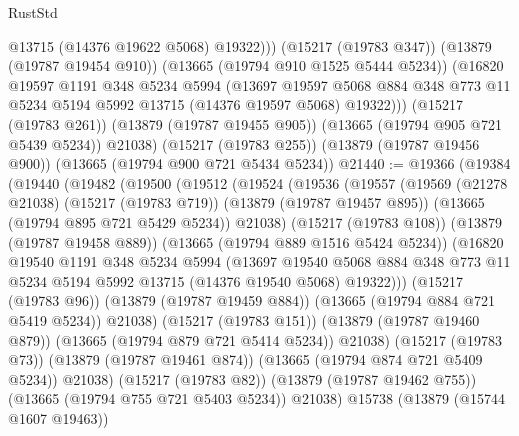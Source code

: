 \begin{lexlean}{RustStd}
\begin{coremodule}
              @13715
              (@14376 @19622 @5068)
              @19322)))
        (@15217 (@19783 @347))
        (@13879 (@19787 @19454 @910))
        (@13665 (@19794 @910 @1525 @5444 @5234))
        (@16820
          @19597
          @1191
          @348
          @5234
          @5994
          (@13697
            @19597
            @5068
            @884
            @348
            @773
            @11
            @5234
            @5194
            @5992
            @13715
            (@14376 @19597 @5068)
            @19322)))
      (@15217 (@19783 @261))
      (@13879 (@19787 @19455 @905))
      (@13665 (@19794 @905 @721 @5439 @5234))
      @21038)
    (@15217 (@19783 @255))
    (@13879 (@19787 @19456 @900))
    (@13665 (@19794 @900 @721 @5434 @5234))
@21440 := @19366
    (@19384
      (@19440
        (@19482
          (@19500
            (@19512
              (@19524
                (@19536
                  (@19557
                    (@19569
                      (@21278 @21038)
                      (@15217 (@19783 @719))
                      (@13879 (@19787 @19457 @895))
                      (@13665 (@19794 @895 @721 @5429 @5234))
                      @21038)
                    (@15217 (@19783 @108))
                    (@13879 (@19787 @19458 @889))
                    (@13665 (@19794 @889 @1516 @5424 @5234))
                    (@16820
                      @19540
                      @1191
                      @348
                      @5234
                      @5994
                      (@13697
                        @19540
                        @5068
                        @884
                        @348
                        @773
                        @11
                        @5234
                        @5194
                        @5992
                        @13715
                        (@14376 @19540 @5068)
                        @19322)))
                  (@15217 (@19783 @96))
                  (@13879 (@19787 @19459 @884))
                  (@13665 (@19794 @884 @721 @5419 @5234))
                  @21038)
                (@15217 (@19783 @151))
                (@13879 (@19787 @19460 @879))
                (@13665 (@19794 @879 @721 @5414 @5234))
                @21038)
              (@15217 (@19783 @73))
              (@13879 (@19787 @19461 @874))
              (@13665 (@19794 @874 @721 @5409 @5234))
              @21038)
            (@15217 (@19783 @82))
            (@13879 (@19787 @19462 @755))
            (@13665 (@19794 @755 @721 @5403 @5234))
            @21038)
          @15738
          (@13879 (@15744 @1607 @19463))

\end{coremodule}
\end{lexlean}
